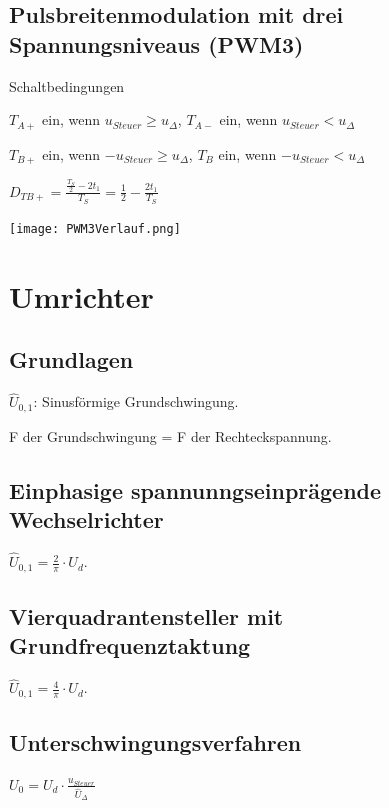 \documentclass[german]{latex4ei/latex4ei_sheet}
\begin{document}
	\begin{sectionbox}
		\subsection{Pulsbreitenmodulation mit drei Spannungsniveaus (PWM3)}
		\begin{bluebox}{Schaltbedingungen}
			\item $T_{A+}$ ein, wenn $u_{Steuer} \geq u_\Delta$, $T_{A-}$ ein, wenn $u_{Steuer} < u_\Delta$
			\item $T_{B+}$ ein, wenn $-u_{Steuer} \geq u_\Delta$, $T_{B}$ ein, wenn $-u_{Steuer} < u_\Delta$
			\item $D_{TB+} = \frac{\frac{T_S}{2}-2t_1}{T_S} = \frac{1}{2}-\frac{2t_1}{T_S}$
			\item \texttt{[image: PWM3Verlauf.png]}
		\end{bluebox}	
	\end{sectionbox}
\section{Umrichter}
\begin{sectionbox}
	\subsection{Grundlagen}
		\begin{bluebox}
			\item $\hat{U}_{0,1}$: Sinusförmige Grundschwingung.
			\item F der Grundschwingung = F der Rechteckspannung.		
		\end{bluebox}
	\subsection{Einphasige spannunngseinprägende Wechselrichter}
		\begin{bluebox}
			\item $\hat{U}_{0,1} = \frac{2}{\pi}\cdot U_d$.	
		\end{bluebox}
	\subsection{Vierquadrantensteller mit Grundfrequenztaktung}
		\begin{bluebox}
			\item $\hat{U}_{0,1} = \frac{4}{\pi}\cdot U_d$.	
		\end{bluebox}
	\subsection{Unterschwingungsverfahren}
		\begin{bluebox}
			\item $U_0 = U_d \cdot \frac{u_{Steuer}}{\hat{U}_\Delta}$
		\end{bluebox}
\end{sectionbox}


\end{document}
